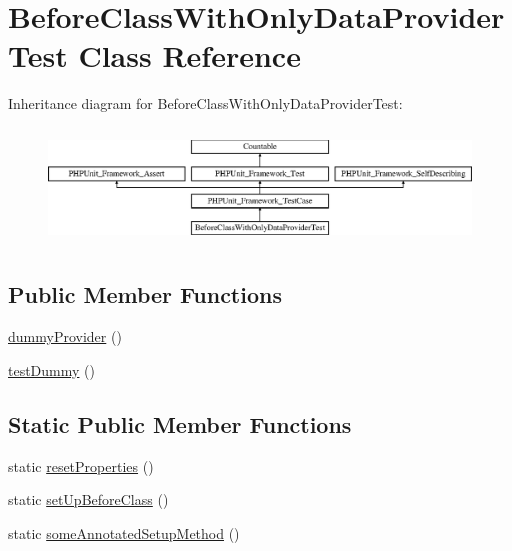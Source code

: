 \hypertarget{class_before_class_with_only_data_provider_test}{}\section{Before\+Class\+With\+Only\+Data\+Provider\+Test Class Reference}
\label{class_before_class_with_only_data_provider_test}
Inheritance diagram for Before\+Class\+With\+Only\+Data\+Provider\+Test\+:\begin{figure}[H]
\begin{center}
\leavevmode
\includegraphics[height=3.137255cm]{class_before_class_with_only_data_provider_test}
\end{center}
\end{figure}
\subsection*{Public Member Functions}
\begin{DoxyCompactItemize}
\item 
\mbox{\hyperlink{class_before_class_with_only_data_provider_test_a785e395ec7ddda79b78e483307610593}{dummy\+Provider}} ()
\item 
\mbox{\hyperlink{class_before_class_with_only_data_provider_test_a3657b08c8e3aaf882296f3e946da23bf}{test\+Dummy}} ()
\end{DoxyCompactItemize}
\subsection*{Static Public Member Functions}
\begin{DoxyCompactItemize}
\item 
static \mbox{\hyperlink{class_before_class_with_only_data_provider_test_a005afccec5fc30c336e4d5d9287760a6}{reset\+Properties}} ()
\item 
static \mbox{\hyperlink{class_before_class_with_only_data_provider_test_a80ef9eb20e7443b38276fb4647985fb7}{set\+Up\+Before\+Class}} ()
\item 
static \mbox{\hyperlink{class_before_class_with_only_data_provider_test_aca35a04b7c84425ef640e0041ff7970a}{some\+Annotated\+Setup\+Method}} ()
\end{DoxyCompactItemize}
